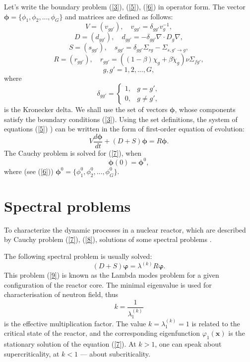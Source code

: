 \documentclass[authoryear]{elsarticle}
\begin{document}
Let’s write the boundary problem (\ref{3}), (\ref{5}), (\ref{6}) in operator form. The vector $\bm \phi = \{\phi_1, \phi_2, ..., \phi_G\}$ and matrices are defined as follows:
\[
 V = (v_{g g'}),
 \quad v_{g g'} = \delta_{g g'} v_g^{-1},
\] 
\[
 D = (d_{g g'}),
 \quad d_{g g'} = - \delta_{g g'} \nabla \cdot D_g \nabla,
\] 
\[
 S = (s_{g g'}),
 \quad  s_{g g'} =  \delta_{g g'} \Sigma_{rg} - \Sigma_{s,g'\rightarrow g} ,
\] 
\[
 R = (r_{g g'}),
 \quad  r_{g g'} = ( (1-\beta) \chi_g + \beta \widetilde{\chi}_g) \nu \Sigma_{fg'} ,
\]
\[
g, g' = 1,2, ..., G,
\] 
where
\[
 \delta_{g g'} = \left \{ 
 \begin{matrix}
 1, & g = g', \\
 0, & g \neq  g',
 \end{matrix}
 \right . 
\] 
is the Kronecker delta.
We shall use the set of vectors $\bm \phi$, whose components satisfy the boundary conditions (\ref{3}). Using the set definitions, the system of equations (\ref{5}) ) can be written in the form of first-order equation of evolution:
\begin{equation}\label{7}
 V \frac{d \bm \phi}{d t} + (D+S) \bm \phi = R \bm \phi .
\end{equation}  
The Cauchy problem is solved for (\ref{7}), when
\begin{equation}\label{8}
 \bm \phi(0) = \bm \phi^0,
\end{equation} 
where (see (\ref{6})) $\bm \phi^0 = \{ \phi_1^0,  \phi_2^0, ...,  \phi_G^0 \}$.

\section{Spectral problems} 

To characterize the dynamic processes in a nuclear reactor, which are described by Cauchy problem (\ref{7}), (\ref{8}), solutions of some spectral problems  \cite{Bell1970,hetrick1971dynamics,stacey}.

The following spectral problem is usually solved:
\begin{equation}\label{9}
 (D+S) \bm \varphi  = \lambda^{(k)} R \bm \varphi .
\end{equation} 
This problem (\ref{9}) is known as the Lambda modes problem for a given configuration of the reactor core.
The minimal eigenvalue is used for characterisation of neutron field, thus 
\[
 k = \frac{1}{\lambda^{(k)}_1}  
\] 
is the effective multiplication factor.
The value $k = \lambda^{(k)}_1 = 1$ is related to the critical state of the reactor, and the corresponding eigenfunction $\varphi_1(\bm x)$ is the stationary solution of the equation (\ref{7}).
At $k > 1$, one can speak about supercriticality, at $k < 1$  --- about subcriticality.
\end{document}

